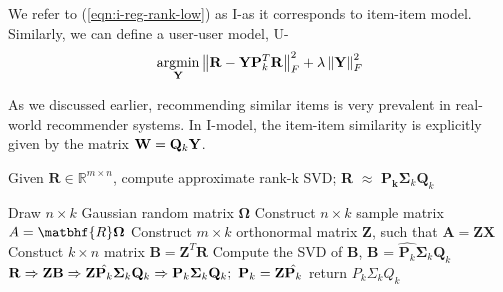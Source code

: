 We refer to (\ref{eqn:i-reg-rank-low}) as I-\LinearLow as it corresponds to item-item model. Similarly, we can define a user-user model, U-\LinearLow
\begin{align}
\label{eqn:u-reg-rank-low}
\underset{\mathbf{Y}}{\mathrm{argmin}}  \left \| \mathbf{R} - \mathbf{Y}\mathbf{P}_k^T\mathbf{R}\right \|_F^2 + \lambda \left \|  \mathbf{Y} \right \|_F^2
\end{align}



As we discussed earlier, recommending similar items is very prevalent in real-world recommender systems.
In I-\LinearLow model, the item-item similarity is explicitly given by the matrix $\mathbf{W} = \mathbf{Q}_k \mathbf{Y} $.


\begin{algorithm}
        \small
        \caption{Given $\textbf{R} \in \mathbb{R}^{m \times n}$, compute approximate rank-k SVD; \textbf{R} $\approx$ $\textbf{P}_\textbf{k} \mathbf{\Sigma}_k \textbf{Q}_k$}
        \label{algo:RSVD}
        \begin{algorithmic}[1]

        \State Draw $n\times k$ Gaussian random matrix $\mathbf{\Omega}$
        \State Construct $n\times k$ sample matrix $A = \matbhf{R}\mathbf{\Omega}$
        \State Construct $m\times k$ orthonormal matrix $\mathbf{Z}$, such that $\mathbf{A}  = \mathbf{Z}\mathbf{X}$
        \State Constuct $k\times n$ matrix $\mathbf{B} = \mathbf{Z}^T\mathbf{R}$
        \State Compute the SVD of \textbf{B}, \textbf{B} =  $\hat{\mathbf{P}_k} \mathbf{\Sigma}_k \mathbf{Q}_k$
        \State  $\mathbf{R} \Rightarrow \mathbf{Z}\mathbf{B} \Rightarrow \mathbf{Z} \hat{\mathbf{P}_k} \mathbf{\Sigma}_k \mathbf{Q}_k \Rightarrow  \mathbf{P}_k \mathbf{\Sigma}_k \mathbf{Q}_k \\ ;\ \mathbf{P}_k = \mathbf{Z} \hat{\mathbf{P}_k}$
        \State return $P_k \Sigma_k Q_k$
        \EndProcedure
        \end{algorithmic}
\end{algorithm}

